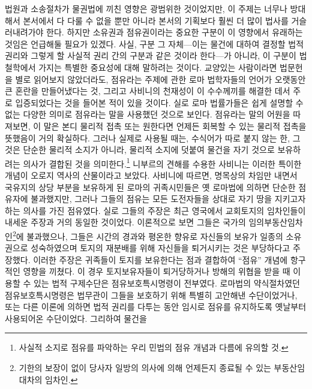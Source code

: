 법원과 소송절차가 물권법에 끼친 영향은 광범위한 것이었지만,
이 주제는 너무나 방대해서 본서에서 다 다룰 수 없을 뿐만 아니라
본서의 기획보다 훨씬 더 많이 법사를 거슬러내려가야 한다.
하지만 소유권과 점유권이라는 중요한 구분이 이 영향에서
유래하는 것임은 언급해둘 필요가 있겠다.
사실, 구분 그 자체---이는
물건에 대하여 결정할 법적 권리와
그렇게 할 사실적 권리 간의 구분과
같은 것이라 한다---가 아니라,
이 구분이 법철학에서 가지는 특별한 중요성에 대해 말하려는 것이다.
교양있는 사람이라면 법문헌을 별로 읽어보지 않았더라도,
점유라는 주제에 관한
로마 법학자들의 언어가 오랫동안 큰 혼란을 만들어냈다는 것,
그리고 사비니의 천재성이 이 수수께끼를 해결한 데서
주로 입증되었다는 것을
들어본 적이 있을 것이다.
실로 로마 법률가들은
쉽게 설명할 수 없는 다양한 의미로
점유라는 말을
사용했던 것으로 보인다.
점유라는 말의 어원을 따져보면, 이 말은 본디
물리적 접촉 또는
원한다면 언제든 회복할 수 있는 물리적 접촉을 뜻했음이 거의 확실하다.
그러나 실제로 사용될 때는,
수식어가 따로 붙지 않는 한,
그것은 단순한 물리적 소지가 아니라,
물리적 소지에 덧붙여
물건을 자기 것으로 보유하려는 의사가 결합된 것을
의미한다.\footnote{%
  사실적 소지로 점유를 파악하는 우리 민법의 점유 개념과 다름에 유의할 것.
  }
니부르의 견해를 수용한 사비니는
이러한 특이한 개념이 오로지 역사의 산물이라고 보았다.
사비니에 따르면,
명목상의 차임만 내면서
국유지의 상당 부분을
보유하게 된
로마의 귀족시민들은
옛 로마법에 의하면 단순한 점유자에
불과했지만, 그러나
그들의 점유는
모든 도전자들을 상대로 자기 땅을 지키고자 하는 의사를 가진 점유였다.
실로 그들의 주장은 최근 영국에서 교회토지의 임차인들이 내세운 주장과
거의 동일한 것이었다.
이론적으로 보면 그들은 국가의
임의부동산임차인\footnote{%
  기한의 보장이 없이
  당사자 일방의 의사에 의해 언제든지 종료될 수 있는 부동산임대차의 임차인.
}에 불과했으나,
그들은 시간의 경과와 평온한 향유로
자신들의 보유가 일종의 소유권으로 성숙하였으며
토지의 재분배를 위해 자신들을 퇴거시키는 것은 부당하다고 주장했다.
이러한 주장은 귀족들이 토지를 보유한다는 점과 결합하여
``점유'' 개념에 항구적인 영향을 끼쳤다.
이 경우
토지보유자들이
퇴거당하거나 방해의 위협을 받을 때
이용할 수 있는 법적 구제수단은
점유보호특시명령이 전부였다.
로마법의 약식절차였던 점유보호특시명령은
법무관이 그들을 보호하기 위해 특별히 고안해낸 수단이었거나,
또는 다른 이론에 의하면
법적 권리를 다투는 동안 임시로 점유를 유지하도록 옛날부터 사용되어온
수단이었다.
그리하여 물건을 
